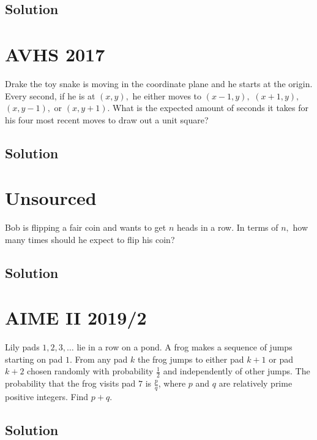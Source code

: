 \documentclass[mast]{lucky}
\begin{document}
\subsection{Solution}    





\pagebreak\section{AVHS 2017} Drake the toy snake is moving in the coordinate plane and he starts at the origin. Every second, if he is at $(x,y),$ he either moves to $(x-1,y),$ $(x+1,y),$ $(x,y-1),$ or $(x,y+1).$ What is the expected amount of seconds it takes for his four most recent moves to draw out a unit square?
\subsection{Solution}




\pagebreak\section{Unsourced}
Bob is flipping a fair coin and wants to get $n$ heads in a row. In terms of $n,$ how many times should he expect to flip his coin?
\subsection{Solution}





\pagebreak\section{AIME II 2019/2} Lily pads $1,2,3,\ldots$ lie in a row on a pond. A frog makes a sequence of jumps starting on pad $1$. From any pad $k$ the frog jumps to either pad $k+1$ or pad $k+2$ chosen randomly with probability $\tfrac{1}{2}$ and independently of other jumps. The probability that the frog visits pad $7$ is $\tfrac{p}{q}$, where $p$ and $q$ are relatively prime positive integers. Find $p+q$.
\subsection{Solution}
\end{document}
